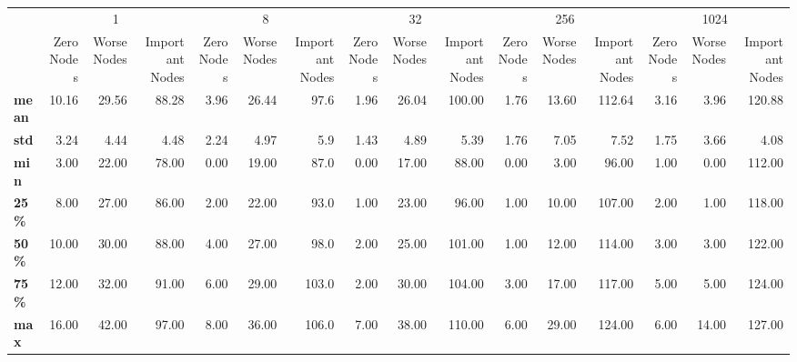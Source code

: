 \begin{tabular}{lrrrrrrrrrrrrrrr}
\toprule
{} & \multicolumn{3}{c}{1} & \multicolumn{3}{c}{8} & \multicolumn{3}{c}{32} & \multicolumn{3}{c}{256} & \multicolumn{3}{c}{1024} \\
{} & Zero Nodes & Worse Nodes & Important Nodes & Zero Nodes & Worse Nodes & Important Nodes & Zero Nodes & Worse Nodes & Important Nodes & Zero Nodes & Worse Nodes & Important Nodes & Zero Nodes & Worse Nodes & Important Nodes \\
\midrule
\textbf{mean} &      10.16 &       29.56 &           88.28 &       3.96 &       26.44 &            97.6 &       1.96 &       26.04 &          100.00 &       1.76 &       13.60 &          112.64 &       3.16 &        3.96 &          120.88 \\
\textbf{std } &       3.24 &        4.44 &            4.48 &       2.24 &        4.97 &             5.9 &       1.43 &        4.89 &            5.39 &       1.76 &        7.05 &            7.52 &       1.75 &        3.66 &            4.08 \\
\textbf{min } &       3.00 &       22.00 &           78.00 &       0.00 &       19.00 &            87.0 &       0.00 &       17.00 &           88.00 &       0.00 &        3.00 &           96.00 &       1.00 &        0.00 &          112.00 \\
\textbf{25\% } &       8.00 &       27.00 &           86.00 &       2.00 &       22.00 &            93.0 &       1.00 &       23.00 &           96.00 &       1.00 &       10.00 &          107.00 &       2.00 &        1.00 &          118.00 \\
\textbf{50\% } &      10.00 &       30.00 &           88.00 &       4.00 &       27.00 &            98.0 &       2.00 &       25.00 &          101.00 &       1.00 &       12.00 &          114.00 &       3.00 &        3.00 &          122.00 \\
\textbf{75\% } &      12.00 &       32.00 &           91.00 &       6.00 &       29.00 &           103.0 &       2.00 &       30.00 &          104.00 &       3.00 &       17.00 &          117.00 &       5.00 &        5.00 &          124.00 \\
\textbf{max } &      16.00 &       42.00 &           97.00 &       8.00 &       36.00 &           106.0 &       7.00 &       38.00 &          110.00 &       6.00 &       29.00 &          124.00 &       6.00 &       14.00 &          127.00 \\
\bottomrule
\end{tabular}
